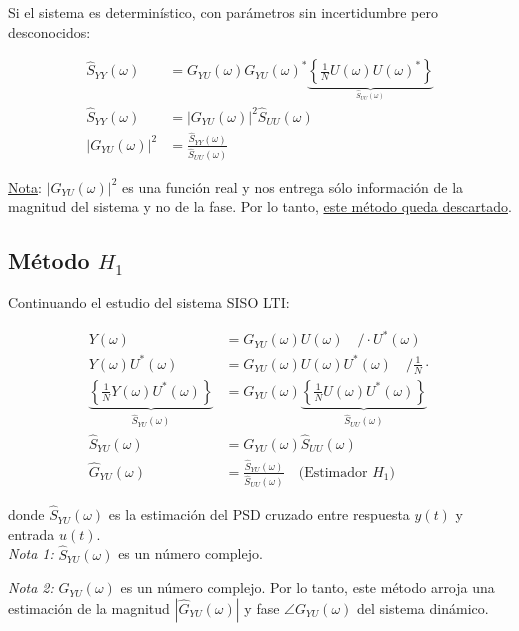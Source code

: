 Si el sistema es determinístico, con parámetros sin incertidumbre pero desconocidos:

\begin{align*}
    \hat{S}_{YY}(\omega) &= G_{YU}(\omega) G_{YU}(\omega)^{*} \underbrace{\left\{ \frac{1}{N}U(\omega) U(\omega)^{*} \right\}}_{_{\hat{S}_{UU}(\omega)}}\\
    \hat{S}_{YY}(\omega) &= \left| G_{YU}(\omega) \right|^2 \hat{S}_{UU}(\omega)\\
    \left| G_{YU}(\omega) \right|^2 &= \frac{\hat{S}_{YY}(\omega)}{\hat{S}_{UU}(\omega)}
\end{align*}

\underline{Nota}: $|G_{YU}(\omega)|^2$ es una función real y nos entrega sólo información de la magnitud del sistema y no de la fase. Por lo tanto, \underline{este método queda descartado}.

\subsection{Método \texorpdfstring{$H_1$}{H1}}

Continuando el estudio del sistema SISO LTI:

\begin{align*}
    Y(\omega) &= G_{YU}(\omega)U(\omega) \quad / \cdot U^{*}(\omega)\\
    Y(\omega)U^{*}(\omega) &= G_{YU}(\omega)U(\omega)U^{*}(\omega) \quad / \frac{1}{N} \cdot \\
    \underbrace{\left\{\frac{1}{N}Y(\omega)U^{*}(\omega)\right\}}_{\hat{S}_{YU}(\omega)} &= G_{YU}(\omega)  \underbrace{\left\{\frac{1}{N} U(\omega)U^{*}(\omega) \right\}}_{\hat{S}_{UU}(\omega)} \\
    \hat{S}_{YU}(\omega) &= G_{YU}(\omega) \hat{S}_{UU}(\omega)\\
    \hat{G}_{YU}(\omega) &= \frac{\hat{S}_{YU}(\omega)}{\hat{S}_{UU}(\omega)} \quad \text{(Estimador $H_1$)}
\end{align*}

donde $\hat{S}_{YU}(\omega)$ es la estimación del PSD cruzado entre respuesta $y(t)$ y entrada $u(t)$.\\

\emph{Nota 1:} $\hat{S}_{YU}(\omega)$ es un número complejo.

\emph{Nota 2:} $\hat{G}_{YU}(\omega)$ es un número complejo. Por lo tanto, este método arroja una estimación de la magnitud  $|\hat{G}_{YU}(\omega)|$ y fase $\angle G_{YU}(\omega)$ del sistema dinámico.

